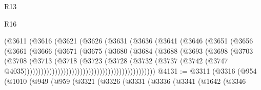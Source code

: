 \begin{lexlean}{R13}
\begin{lexlean}{R16}
\begin{coremodule}
{{{{{{{{{{{{{{{{{{{{{{{{{{{{{{{{{{{{{{{{{{{{{{{{{{{{{{{{{{{{{{{{{{{{{{{{{{{{{{{{{{{{{{{{{{{{{{{{{{{{{{{{{{{{{{{{{                                        (@3611
                                          (@3616
                                            (@3621
                                              (@3626
                                                (@3631
                                                  (@3636
                                                    (@3641
                                                      (@3646
                                                        (@3651
                                                          (@3656
                                                            (@3661
                                                              (@3666
                                                                (@3671
                                                                  (@3675
                                                                    (@3680
                                                                      (@3684
                                                                        (@3688
                                                                          (@3693
                                                                            (@3698
                                                                              (@3703
                                                                                (@3708
                                                                                  (@3713
                                                                                    (@3718
                                                                                      (@3723
                                                                                        (@3728
                                                                                          (@3732
                                                                                            (@3737
                                                                                              (@3742
                                                                                                (@3747
                                                                                                  @4035)))))))))))))))))))))))))))))))))))))))))))))))
@4131 := @3311
    (@3316
      (@954
        (@1010
          (@949
            (@959
              (@3321
                (@3326
                  (@3331
                    (@3336
                      (@3341
                        (@1642
                          (@3346
}}}}}}}}}}}}}}}}}}}}}}}}}}}}}}}}}}}}}}}}}}}}}}}}}}}}}}}}}}}}}}}}}}}}}}}}}}}}}}}}}}}}}}}}}}}}}}}}}}}}}}}}}}}}}}}}}
\end{coremodule}
\end{lexlean}
\end{lexlean}
